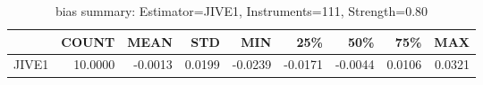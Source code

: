 \begin{table}[ht]
\centering
\caption{bias summary: Estimator=JIVE1, Instruments=111, Strength=0.80}
\begin{tabular}{lrrrrrrrr}
\toprule
 & COUNT & MEAN & STD & MIN & 25\% & 50\% & 75\% & MAX \\
\midrule
JIVE1 & 10.0000 & -0.0013 & 0.0199 & -0.0239 & -0.0171 & -0.0044 & 0.0106 & 0.0321 \\
\bottomrule
\end{tabular}
\end{table}
